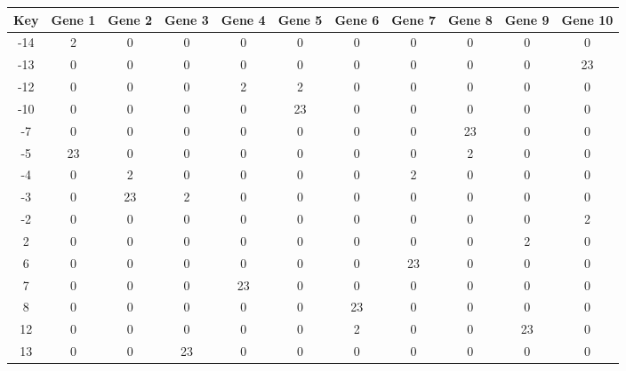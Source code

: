 \begin{tabular}{|c|c|c|c|c|c|c|c|c|c|c|}
\hline
Key & Gene 1 & Gene 2 & Gene 3 & Gene 4 & Gene 5 & Gene 6 & Gene 7 & Gene 8 & Gene 9 & Gene 10 \\
\hline
-14 & 2 & 0 & 0 & 0 & 0 & 0 & 0 & 0 & 0 & 0 \\
-13 & 0 & 0 & 0 & 0 & 0 & 0 & 0 & 0 & 0 & 23 \\
-12 & 0 & 0 & 0 & 2 & 2 & 0 & 0 & 0 & 0 & 0 \\
-10 & 0 & 0 & 0 & 0 & 23 & 0 & 0 & 0 & 0 & 0 \\
-7 & 0 & 0 & 0 & 0 & 0 & 0 & 0 & 23 & 0 & 0 \\
-5 & 23 & 0 & 0 & 0 & 0 & 0 & 0 & 2 & 0 & 0 \\
-4 & 0 & 2 & 0 & 0 & 0 & 0 & 2 & 0 & 0 & 0 \\
-3 & 0 & 23 & 2 & 0 & 0 & 0 & 0 & 0 & 0 & 0 \\
-2 & 0 & 0 & 0 & 0 & 0 & 0 & 0 & 0 & 0 & 2 \\
2 & 0 & 0 & 0 & 0 & 0 & 0 & 0 & 0 & 2 & 0 \\
6 & 0 & 0 & 0 & 0 & 0 & 0 & 23 & 0 & 0 & 0 \\
7 & 0 & 0 & 0 & 23 & 0 & 0 & 0 & 0 & 0 & 0 \\
8 & 0 & 0 & 0 & 0 & 0 & 23 & 0 & 0 & 0 & 0 \\
12 & 0 & 0 & 0 & 0 & 0 & 2 & 0 & 0 & 23 & 0 \\
13 & 0 & 0 & 23 & 0 & 0 & 0 & 0 & 0 & 0 & 0 \\
\hline
\end{tabular}
